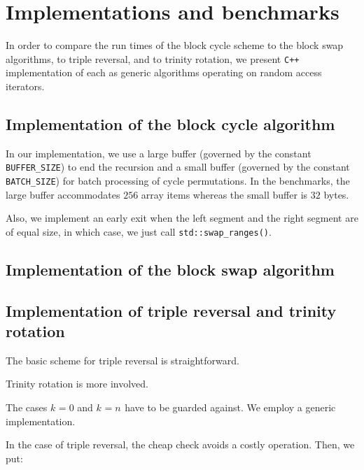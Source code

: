 \documentclass[12pt,a4paper]{article}
\newcommand{\Size}[1][]{n_{#1}}
\newcommand{\Shift}[1][]{k_{#1}}
\begin{document}
  
  \section{Implementations and benchmarks}\label{sec.benchmarks}
  In order to compare the run times of the block cycle scheme to the
  block swap algorithms, to triple reversal, and to trinity rotation, we
  present \verb-C++- implementation of each as generic algorithms
  operating on random access iterators.


  \subsection*{Implementation of the block cycle algorithm}
  In our implementation, we use a large buffer (governed by the constant
  \verb+BUFFER_SIZE+) to end the recursion and a small buffer (governed
  by the constant \verb+BATCH_SIZE+) for batch processing of cycle
  permutations. In the benchmarks, the large buffer accommodates
  $256$ array items whereas the small buffer is $32$ bytes.
  
  Also, we implement an early exit when the left segment
  and the right segment are of equal size, in which case, we just call
  \verb+std::swap_ranges()+.

  
  
  \subsection*{Implementation of the block swap algorithm}
  
  
  \subsection*{Implementation of triple reversal and trinity rotation}
  The basic scheme for triple reversal is straightforward.

  

  Trinity rotation is more involved.

  
  
  The cases $\Shift=0$ and $\Shift=\Size$ have to be guarded
  against. We employ a generic implementation.

  

  In the case of triple reversal, the cheap check
  avoids a costly operation. Then, we put:
  
\end{document}
